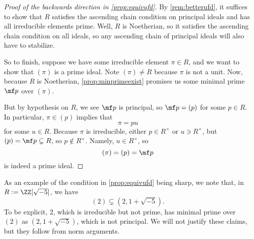 \begin{proof}[Proof of the backwards direction in \autoref{prop:equivufd}]
	By \autoref{rem:betterufd}, it suffices to show that $R$ satisfies the ascending chain condition on principal ideals and has all irreducible elements prime. Well, $R$ is Noetherian, so it satisfies the ascending chain condition on all ideals, so any ascending chain of principal ideals will also have to stabilize.

	So to finish, suppose we have some irreducible element $\pi\in R$, and we want to show that $(\pi)$ is a prime ideal. Note $(\pi)\ne R$ because $\pi$ is not a unit. Now, because $R$ is Noetherian, \autoref{prop:minprimeexist} promises us some minimal prime $\mf p$ over $(\pi)$.

	But by hypothesis on $R$, we see $\mf p$ is principal, so $\mf p=(p)$ for some $p\in R$. In particular, $\pi\in(p)$ implies that
	\[\pi=pu\]
	for some $u\in R$. Because $\pi$ is irreducible, either $p\in R^\times$ or $u\ni R^\times$, but $(p)=\mf p\subsetneq R$, so $p\notin R^\times$. Namely, $u\in R^\times$, so
	\[(\pi)=(p)=\mf p\]
	is indeed a prime ideal.
\end{proof}
\begin{remark}[Nir]
	As an example of the condition in \autoref{prop:equivufd} being sharp, we note that, in $R:=\ZZ[\sqrt{-5}]$, we have
	\[(2)\subsetneq\left(2,1+\sqrt{-5}\right).\]
	To be explicit, $2$, which is irreducible but not prime, has minimal prime over $(2)$ as $\left(2,1+\sqrt{-5}\right)$, which is not principal. We will not justify these claims, but they follow from norm arguments.
\end{remark}


